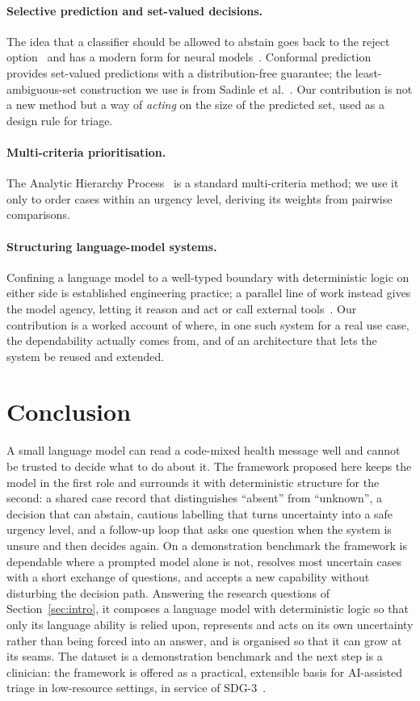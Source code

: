 \documentclass[11pt]{article}
\begin{document}
\paragraph{Selective prediction and set-valued decisions.} The idea that a classifier should be allowed to
abstain goes back to the reject option~\cite{chow} and has a modern form for neural models~\cite{geifman}.
Conformal prediction~\cite{vovk,angelopoulos} provides set-valued predictions with a distribution-free
guarantee; the least-ambiguous-set construction we use is from Sadinle et al.~\cite{sadinle}. Our contribution
is not a new method but a way of \emph{acting} on the size of the predicted set, used as a design rule for
triage.

\paragraph{Multi-criteria prioritisation.} The Analytic Hierarchy Process~\cite{saaty} is a standard
multi-criteria method; we use it only to order cases within an urgency level, deriving its weights from
pairwise comparisons.

\paragraph{Structuring language-model systems.} Confining a language model to a well-typed boundary with
deterministic logic on either side is established engineering practice; a parallel line of work instead gives
the model agency, letting it reason and act or call external tools~\cite{react,toolformer,agentsurvey}. Our
contribution is a worked account
of where, in one such system for a real use case, the dependability actually comes from, and of an
architecture that lets the system be reused and extended.

\section{Conclusion}
\label{sec:conclusion}
A small language model can read a code-mixed health message well and cannot be trusted to decide what to do
about it. The framework proposed here keeps the model in the first role and surrounds it with deterministic
structure for the second: a shared case record that distinguishes ``absent'' from ``unknown'', a decision
that can abstain, cautious labelling that turns uncertainty into a safe urgency level, and a follow-up loop
that asks one question when the system is unsure and then decides again. On a demonstration benchmark the
framework is dependable where a prompted model alone is not, resolves most uncertain cases with a short
exchange of questions, and accepts a new capability without disturbing the decision path. Answering the
research questions of Section~\ref{sec:intro}, it composes a language model with deterministic logic so that
only its language ability is relied upon, represents and acts on its own uncertainty rather than being forced
into an answer, and is organised so that it can grow at its seams. The dataset is a demonstration benchmark
and the next step is a clinician: the framework is offered as a practical, extensible basis for AI-assisted
triage in low-resource settings, in service of SDG-3~\cite{un2030}.
\end{document}
